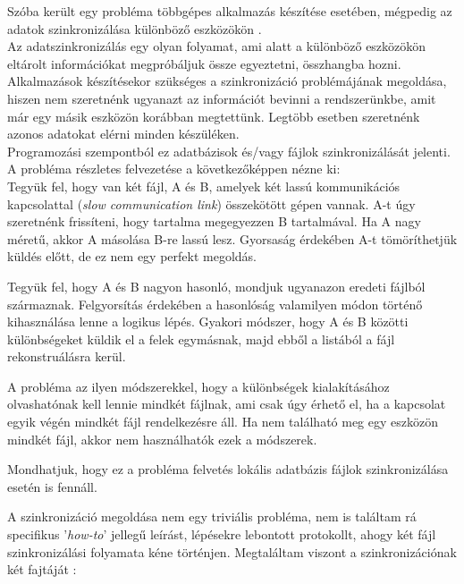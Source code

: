 

Szóba került egy probléma többgépes alkalmazás készítése esetében, mégpedig az adatok szinkronizálása különböző eszközökön \cite{nakatani2006data}.
\vspace{5pt} \\ Az adatszinkronizálás egy olyan folyamat, ami alatt a különböző eszközökön eltárolt információkat megpróbáljuk össze egyeztetni, összhangba hozni.
\vspace{5pt} \\Alkalmazások készítésekor szükséges a szinkronizáció problémájának megoldása, hiszen nem szeretnénk ugyanazt az információt bevinni a rendszerünkbe, amit már egy másik eszközön korábban megtettünk. Legtöbb esetben szeretnénk azonos adatokat elérni minden készüléken.
\vspace{5pt} \\Programozási szempontból ez adatbázisok és/vagy fájlok szinkronizálását jelenti.
\vspace{15pt} \\ A probléma részletes felvezetése a következőképpen nézne ki:
\vspace{5pt} \\  Tegyük fel, hogy van két fájl, A és B, amelyek két lassú kommunikációs kapcsolattal (\textit{slow communication link}) összekötött gépen vannak. A-t úgy szeretnénk frissíteni, hogy tartalma megegyezzen B tartalmával.  Ha A nagy méretű, akkor A másolása B-re lassú lesz. Gyorsaság érdekében A-t tömöríthetjük küldés előtt, de ez nem egy perfekt megoldás.

Tegyük fel, hogy A és B nagyon hasonló, mondjuk ugyanazon eredeti fájlból származnak. Felgyorsítás érdekében a hasonlóság valamilyen módon történő kihasználása lenne a logikus lépés. Gyakori módszer, hogy A és B közötti különbségeket küldik el a felek egymásnak, majd ebből a listából a fájl rekonstruálásra kerül. 

A probléma az ilyen módszerekkel, hogy a különbségek kialakításához olvashatónak kell lennie mindkét fájlnak, ami csak úgy érhető el, ha a kapcsolat egyik végén mindkét fájl rendelkezésre áll. Ha nem található meg egy eszközön mindkét fájl, akkor nem használhatók ezek a módszerek.

Mondhatjuk, hogy ez a probléma felvetés lokális adatbázis fájlok szinkronizálása esetén is fennáll.

A szinkronizáció megoldása nem egy triviális probléma, nem is találtam rá specifikus '\textit{how-to}' jellegű leírást, lépésekre lebontott protokollt, ahogy két fájl szinkronizálási folyamata kéne történjen.
Megtaláltam viszont a szinkronizációnak két fajtáját \cite{balaji2020blog}:

